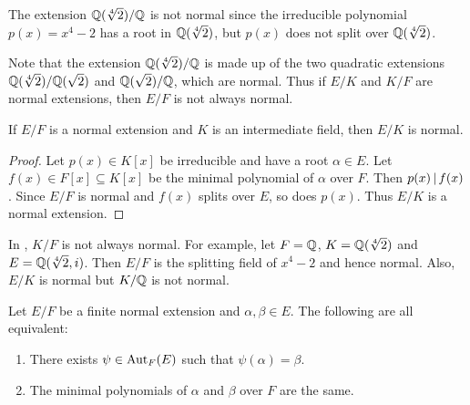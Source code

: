 \documentclass[11pt]{article}
\begin{document}
\begin{example}
    The extension $\mathbb{Q}(\sqrt[4]{2})/\mathbb{Q}$ is not normal since the irreducible polynomial $p(x)=x^4-2$ has a root in $\mathbb{Q}(\sqrt[4]{2})$, but $p(x)$ does not split over $\mathbb{Q}(\sqrt[4]{2})$.

    Note that the extension $\mathbb{Q}(\sqrt[4]{2})/\mathbb{Q}$ is made up of the two quadratic extensions $\mathbb{Q}(\sqrt[4]{2})/\mathbb{Q}(\sqrt{2})$ and $\mathbb{Q}(\sqrt{2})/\mathbb{Q}$, which are normal. Thus if $E/K$ and $K/F$ are normal extensions, then $E/F$ is not always normal.
\end{example}

\begin{proposition}
    If $E/F$ is a normal extension and $K$ is an intermediate field, then $E/K$ is normal.
\end{proposition}

\begin{proof}
    Let $p(x)\in K[x]$ be irreducible and have a root $\alpha\in E$. Let $f(x)\in F[x]\subseteq K[x]$ be the minimal polynomial of $\alpha$ over $F$. Then $p(x)\,|\, f(x)$. Since $E/F$ is normal and $f(x)$ splits over $E$, so does $p(x)$. Thus $E/K$ is a normal extension.
\end{proof}

\begin{remark}
    In , $K/F$ is not always normal. For example, let $F=\mathbb{Q}$, $K=\mathbb{Q}(\sqrt[4]{2})$ and $E=\mathbb{Q}(\sqrt[4]{2},i)$. Then $E/F$ is the splitting field of $x^4-2$ and hence normal. Also, $E/K$ is normal but $K/\mathbb{Q}$ is not normal.
\end{remark}

\begin{proposition}
    Let $E/F$ be a finite normal extension and $\alpha,\beta\in E$. The following are all equivalent:
    \begin{enumerate}
        \item There exists $\psi\in\operatorname{Aut}_F(E)$ such that $\psi(\alpha)=\beta$.
        \item The minimal polynomials of $\alpha$ and $\beta$ over $F$ are the same.
    \end{enumerate}
\end{proposition}
\end{document}
